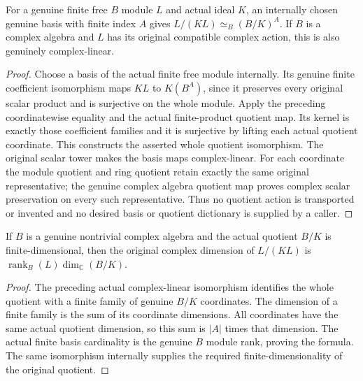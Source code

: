 \begin{theorem}
\label{hir:relative-normal-actual-finite-free-quotient-dictionary}
\leanok
For a genuine finite free $B$ module $L$ and actual ideal $K$, an internally
chosen genuine basis with finite index $A$ gives
$L/(KL)\simeq_B (B/K)^A$. If $B$ is a complex algebra and $L$ has its
original compatible complex action, this is also genuinely complex-linear.
\end{theorem}
\begin{proof}
Choose a basis of the actual finite free module internally. Its genuine
finite coefficient isomorphism maps $KL$ to $K(B^A)$, since it preserves
every original scalar product and is surjective on the whole module.
Apply the preceding coordinatewise equality and the actual finite-product
quotient map. Its kernel is exactly those coefficient families and it is
surjective by lifting each actual quotient coordinate. This constructs
the asserted whole quotient isomorphism. The original scalar tower makes
the basis maps complex-linear. For each coordinate the module quotient
and ring quotient retain exactly the same original representative; the
genuine complex algebra quotient map proves complex scalar preservation
on every such representative. Thus no quotient action is transported or
invented and no desired basis or quotient dictionary is supplied by a caller.
\end{proof}

\begin{theorem}
\label{hir:relative-normal-actual-finite-free-quotient-dimension}
\leanok
If $B$ is a genuine nontrivial complex algebra and the actual quotient $B/K$ is finite-dimensional, then
the original complex dimension of $L/(KL)$ is
$\operatorname{rank}_B(L)\dim_{\mathbb C}(B/K)$.
\end{theorem}
\begin{proof}
The preceding actual complex-linear isomorphism identifies the whole
quotient with a finite family of genuine $B/K$ coordinates. The dimension
of a finite family is the sum of its coordinate dimensions. All coordinates
have the same actual quotient dimension, so this sum is $|A|$ times that
dimension. The actual finite basis cardinality is the genuine $B$ module
rank, proving the formula. The same isomorphism internally supplies the
required finite-dimensionality of the original quotient.
\end{proof}


